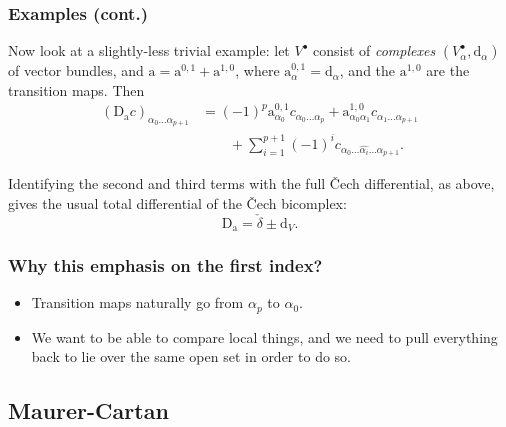 \documentclass{beamer}
\begin{document}
        \begin{frame}\frametitle{Examples (cont.)}
            \begin{example}
                Now look at a slightly-less trivial example: let $V^\bullet$ consist of \emph{complexes} $(V_\alpha^\bullet,\mathrm{d}_\alpha)$ of vector bundles, and $\mathrm{a} = \mathrm{a}^{0,1}+\mathrm{a}^{1,0}$, where $\mathrm{a}_{\alpha}^{0,1} = \mathrm{d}_\alpha$, and the $\mathrm{a}^{1,0}$ are the transition maps.
                Then
                \begin{align*}
                    (\mathrm{D}_\mathrm{a}c)_{\alpha_0\ldots\alpha_{p+1}} &= (-1)^p\mathrm{a}_{\alpha_0}^{0,1}c_{\alpha_0\ldots\alpha_p} + \mathrm{a}_{\alpha_0\alpha_1}^{1,0}c_{\alpha_1\ldots\alpha_{p+1}}\\
                    &\qquad+\sum_{i=1}^{p+1}(-1)^i c_{\alpha_0\ldots\widehat{\alpha_i}\ldots\alpha_{p+1}}.
                \end{align*}

                \pause
                
                Identifying the second and third terms with the full Čech differential, as above, gives the usual total differential of the Čech bicomplex:
                \begin{equation*}
                    \mathrm{D}_\mathrm{a} = \check{\delta} \pm \mathrm{d}_V.
                \end{equation*}
            \end{example}
        \end{frame}

        \begin{frame}\frametitle{Why this emphasis on the first index?}
            \begin{itemize}
                \item Transition maps naturally go from $\alpha_p$ to $\alpha_0$.
                \pause
                \item We want to be able to compare local things, and we need to pull everything back to lie over the same open set in order to do so.
            \end{itemize}
        \end{frame}

    \subsection{Maurer-Cartan}
\end{document}
